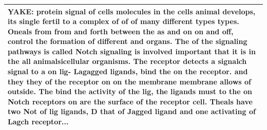 \begin{table}[htbp]
\begin{tabular}{|p{12cm}|}
\hline
\textbf{YAKE:} \colorbox{red!20}{protein signal of cells} \colorbox{red!20}{molecules in the cells} animal develops, \colorbox{red!20}{its single fertil to a complex} \colorbox{red!20}{of of of many different} \colorbox{red!20}{types types}. \colorbox{red!20}{Oneals from from and forth} \colorbox{red!20}{between the as and on on} \colorbox{red!20}{and off}, \colorbox{red!20}{control the formation of} \colorbox{red!20}{different and organs}. \colorbox{red!20}{The of the signaling} \colorbox{red!20}{pathways is called Notch} \colorbox{red!20}{signaling is involved} \colorbox{red!20}{important that it is in the} \colorbox{red!20}{all} animalsicellular organisms. \colorbox{red!20}{The receptor detects a} \colorbox{red!20}{signalch signal to a on lig-} \colorbox{red!20}{Lagagged ligands}, bind the on the receptor. and they they of the receptor on on the membrane membrane allows of outside. \colorbox{red!20}{The bind the activity of the} \colorbox{red!20}{lig, the ligands must to the} \colorbox{red!20}{on Notch receptors on are} \colorbox{red!20}{the surface of the receptor} \colorbox{red!20}{cell}. Theals have two Not of lig ligands, D that of Jagged ligand and one activating of Lagch receptor... \\
\hline
\end{tabular}
\end{table}

